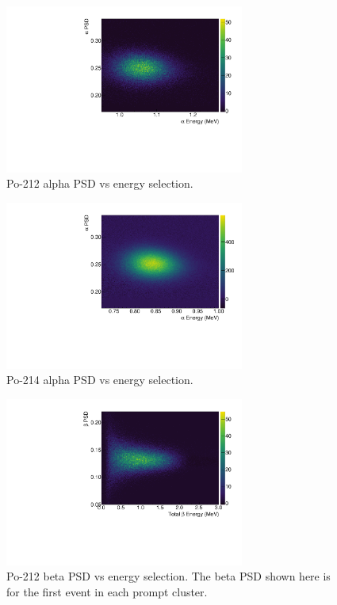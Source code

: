 \begin{figure}[!h]
\centering
\includegraphics[width=0.7\textwidth]{figures/BiPo212AlphaPSDvsE.pdf}
\caption{\label{fig:apsd212}Po-212 alpha PSD vs energy selection.}
\end{figure}
\begin{figure}[!h]
\centering
\includegraphics[width=0.7\textwidth]{figures/BiPo214AlphaPSDvsE.pdf}
\caption{\label{fig:apsd214}Po-214 alpha PSD vs energy selection.}
\end{figure}
\begin{figure}[!b]
\centering
\includegraphics[width=0.7\textwidth]{figures/BiPo212BetaPSDvsE.pdf}
\caption{\label{fig:bpsd212}Po-212 beta PSD vs energy selection. The beta PSD shown here is for the first event in each prompt cluster.}
\end{figure}

